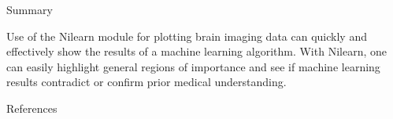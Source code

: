 \documentclass[final]{beamer}
\newlength{\onecolwid}
\begin{document}
\begin{frame}[t]
\begin{columns}[t]
\begin{column}{\onecolwid}
        
    
    \begin{alertblock}{Summary}
    
        Use of the Nilearn module for plotting brain imaging data can quickly and effectively show the results of a machine learning algorithm. With Nilearn, one can easily highlight general regions of importance and see if machine learning results contradict or confirm prior medical understanding.
    
    \end{alertblock} 
    
        
        
        
        
        
        \begin{block}{References}
        

\end{block}
\end{column}
\end{columns}
\end{frame}
\end{document}

